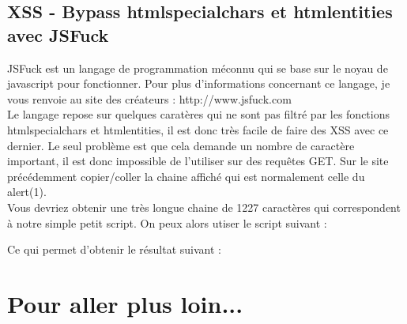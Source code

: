 \documentclass{article}
\begin{document}
\subsection{XSS - Bypass htmlspecialchars et htmlentities avec JSFuck}

JSFuck est un langage de programmation méconnu qui se base sur le noyau de javascript pour fonctionner. Pour plus d'informations concernant ce langage, je vous renvoie au site des créateurs : http://www.jsfuck.com\\
Le langage repose sur quelques caratères qui ne sont pas filtré par les fonctions htmlspecialchars et htmlentities, il est donc très facile de faire des XSS avec ce dernier. Le seul problème est que cela demande un nombre de caractère important, il est donc impossible de l'utiliser sur des requêtes GET. Sur le site précédemment copier/coller la chaine affiché qui est normalement celle du alert(1).\\

Vous devriez obtenir une très longue chaine de 1227 caractères qui correspondent à notre simple petit script. On peux alors utiser le script suivant :
\vspace{0.2cm}\\
\fbox{\parbox{\textwidth}{
javascript:[][(![]...et la suite de la chaine
}}
\vspace{0.2cm}
	
Ce qui permet d'obtenir le résultat suivant :
\vspace{0.2cm}\\
\vspace{0.2cm}

\newpage
\section{Pour aller plus loin...}
\end{document}
